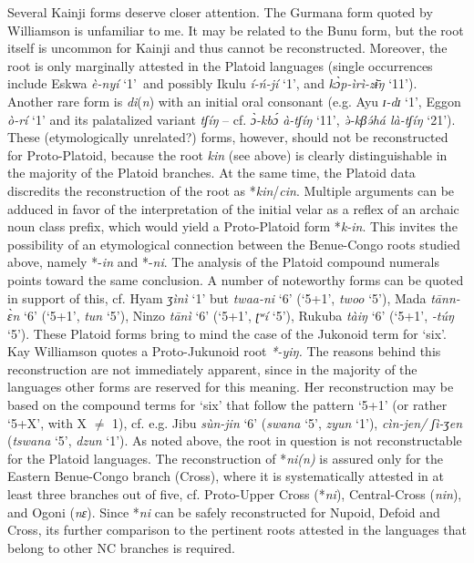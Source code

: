 Several Kainji forms deserve closer attention. The Gurmana form quoted by Williamson is unfamiliar to me. It may be related to the Bunu form, but the root itself is uncommon for Kainji and thus cannot be reconstructed. Moreover, the root is only marginally attested in the Platoid languages (single occurrences include Eskwa \textit{è-nyí} ‘1’~and possibly Ikulu \textit{í-ń-jí} ‘1’, and \textit{k{\`{ɔ}}p-ìrì-z{\={ɨ}}ŋ} ‘11’). Another rare form is \textit{di}(\textit{n}) with an initial oral consonant (e.g. Ayu \textit{ɪ-dɪ} ‘1’, Eggon \textit{ò-rí} ‘1’ and its palatalized variant \textit{tʃíŋ} – cf. \textit{{\`{ɔ}}-kb{\'{ɔ}} à-tʃíŋ} ‘11’, \textit{{\`{ə}}-kβ}\textit{{\'{ə}}há là-tʃíŋ} ‘21’). These (etymologically unrelated?) forms, however, should not be reconstructed for Proto-Platoid, because the root \textit{kin} (see above) is clearly distinguishable in the majority of the Platoid branches. At the same time, the Platoid data discredits the reconstruction of the root as *\textit{kin}/\textit{cin}. Multiple arguments can be adduced in favor of the interpretation of the initial velar as a reflex of an archaic noun class prefix, which would yield a Proto-Platoid form *\textit{k-in}. This invites the possibility of an etymological connection between the Benue-Congo roots studied above, namely *-\textit{in} and *-\textit{ni}. The analysis of the Platoid compound numerals points toward the same conclusion. A number of noteworthy forms can be quoted in support of this, cf.  Hyam \textit{ʒìnì} ‘1’ but \textit{twaa-ni} ‘6’ (‘5+1’, \textit{twoo} ‘5’), Mada \textit{tānn-{\`{ɛ}}n} ‘6’ (‘5+1’, \textit{tun} ‘5’), Ninzo \textit{tānì} ‘6’ (‘5+1’, \textit{ʈʷí} ‘5’), Rukuba \textit{tàiŋ} ‘6’ (‘5+1’, \textit{-túŋ} ‘5’). These Platoid forms bring to mind the case of the Jukonoid term for ‘six’. Kay Williamson quotes a Proto-Jukunoid root \textit{*-yiŋ.} The reasons behind this reconstruction are not immediately apparent, since in the majority of the languages other forms are reserved for this meaning. Her reconstruction may be based on the compound terms for ‘six’ that follow the pattern ‘5+1’ (or rather ‘5+X’, with X ${\neq}$ 1), cf. e.g. Jibu \textit{sùn-jin} ‘6’ (\textit{swana} ‘5’, \textit{zyun} ‘1’), \textit{cìn-jen/ ʃì-ʒen} (\textit{tswana} ‘5’, \textit{dzun} ‘1’). As noted above, the root in question is not reconstructable for the Platoid languages. The reconstruction of *\textit{ni(n)} is assured only for the Eastern Benue-Congo branch (Cross), where it is systematically attested in at least three branches out of five, cf. Proto-Upper Cross (*\textit{ni}), Central-Cross (\textit{nin}), and Ogoni (\textit{nɛ}). Since *\textit{ni} can be safely reconstructed for Nupoid, Defoid and Cross, its further comparison to the pertinent roots attested in the languages that belong to other NC branches is required.

